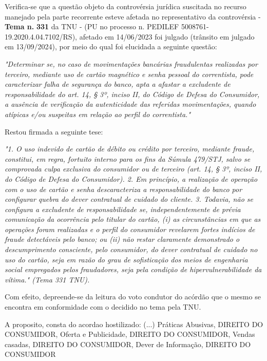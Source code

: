 \documentclass[12pt]{article}
\begin{document}
\justifying
\noindent Verifica-se que a questão objeto da controvérsia jurídica suscitada no recurso manejado pela parte recorrente esteve afetada no representativo da controvérsia - \textbf{Tema n. }\textbf{331} da TNU - (PU no processo n. PEDILEF 5008761-19.2020.4.04.7102/RS),  afetado em 14/06/2023 foi julgado (trânsito em julgado em 13/09/2024), por meio do qual foi elucidada a seguinte questão:

\noindent \textit{"Determinar se, no caso de movimentações bancárias fraudulentas realizadas por terceiro, mediante uso de cartão magnético e senha pessoal do correntista, pode caracterizar falha de segurança do banco, apta a afastar a excludente de responsabilidade do art. 14, § 3º, inciso II, do Código de Defesa do Consumidor, a ausência de verificação da autenticidade das referidas movimentações, quando atípicas e/ou suspeitas em relação ao perfil do correntista."}

\noindent Restou firmada a seguinte tese:

\noindent \textit{"1. O uso indevido de cartão de débito ou crédito por terceiro, mediante fraude, constitui, em regra, fortuito interno para os fins da Súmula 479/STJ, salvo se comprovada culpa exclusiva do consumidor ou de terceiro (art. 14, § 3º, inciso II, do Código de Defesa do Consumidor). 2. Em princípio, a realização de operação com o uso de cartão e senha descaracteriza a responsabilidade do banco por configurar quebra do dever contratual de cuidado do cliente. 3. Todavia, não se configura a excludente de responsabilidade se, independentemente de prévia comunicação da ocorrência pelo titular do cartão, (i) as circunstâncias em que as operações foram realizadas e o perfil do consumidor revelarem fortes indícios de fraude detectáveis pelo banco; ou (ii) não restar claramente demonstrado o descumprimento consciente, pelo consumidor, do dever contratual de cuidado no uso do cartão, seja em razão do grau de sofisticação dos meios de engenharia social empregados pelos fraudadores, seja pela condição de hipervulnerabilidade da vítima." (Tema 331 TNU).}

\noindent Com efeito, depreende-se da leitura do voto condutor do acórdão que o mesmo se encontra em conformidade com o decidido no  tema pela TNU.

\noindent A proposito, consta do acordao hostilizado: (...) Práticas Abusivas, DIREITO DO CONSUMIDOR, Oferta e Publicidade, DIREITO DO CONSUMIDOR, Vendas casadas, DIREITO DO CONSUMIDOR, Dever de Informação, DIREITO DO CONSUMIDOR
\end{document}

